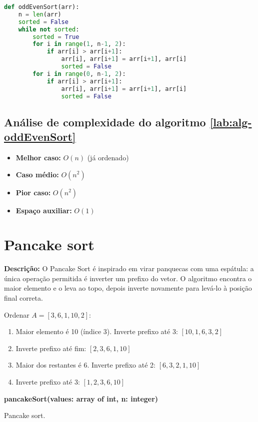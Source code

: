 \begin{lstlisting}[language=python,caption={Odd-Even sort em Python},captionpos=t]
def oddEvenSort(arr):
    n = len(arr)
    sorted = False
    while not sorted:
        sorted = True
        for i in range(1, n-1, 2):
            if arr[i] > arr[i+1]:
                arr[i], arr[i+1] = arr[i+1], arr[i]
                sorted = False
        for i in range(0, n-1, 2):
            if arr[i] > arr[i+1]:
                arr[i], arr[i+1] = arr[i+1], arr[i]
                sorted = False
\end{lstlisting}

\subsection{Análise de complexidade do algoritmo \ref{lab:alg-oddEvenSort}}
\begin{itemize}
    \item \textbf{Melhor caso:} $O(n)$ (já ordenado)
    \item \textbf{Caso médio:} $O(n^2)$
    \item \textbf{Pior caso:} $O(n^2)$
    \item \textbf{Espaço auxiliar:} $O(1)$
\end{itemize}


\section{Pancake sort}
\textbf{Descrição:} O Pancake Sort é inspirado em virar panquecas com uma espátula: a única operação permitida é inverter um prefixo do vetor. O algoritmo encontra o maior elemento e o leva ao topo, depois inverte novamente para levá-lo à posição final correta.

\begin{exmp}
Ordenar $A = [3, 6, 1, 10, 2]$:

\begin{enumerate}
    \item Maior elemento é 10 (índice 3). Inverte prefixo até 3: $[10, 1, 6, 3, 2]$
    \item Inverte prefixo até fim: $[2, 3, 6, 1, 10]$
    \item Maior dos restantes é 6. Inverte prefixo até 2: $[6, 3, 2, 1, 10]$
    \item Inverte prefixo até 3: $[1, 2, 3, 6, 10]$
\end{enumerate}
\end{exmp}

\begin{center}
\begin{minipage}{.9\linewidth}
\begin{algorithm}[H]
\DontPrintSemicolon
\textbf{pancakeSort(values: array of int, n: integer)}

\caption{Pancake sort.}
\label{lab:alg-pancakeSort}
\end{algorithm}
\end{minipage}
\end{center}

